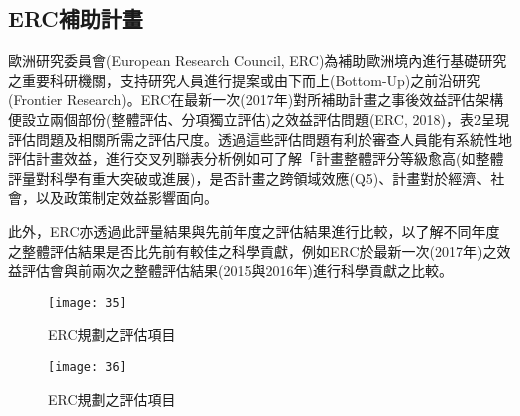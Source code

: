 \subsection{ERC補助計畫}
\par
\renewcommand{\baselinestretch}{1} %
\twelve 歐洲研究委員會(European Research Council, ERC)為補助歐洲境內進行基礎研究之重要科研機關，支持研究人員進行提案或由下而上(Bottom-Up)之前沿研究(Frontier Research)。ERC在最新一次(2017年)對所補助計畫之事後效益評估架構便設立兩個部份(整體評估、分項獨立評估)之效益評估問題(ERC, 2018)，表2呈現評估問題及相關所需之評估尺度。透過這些評估問題有利於審查人員能有系統性地評估計畫效益，進行交叉列聯表分析例如可了解「計畫整體評分等級愈高(如整體評量對科學有重大突破或進展)，是否計畫之跨領域效應(Q5)、計畫對於經濟、社會，以及政策制定效益影響面向。
\\
\par
\renewcommand{\baselinestretch}{1} %
\twelve 此外，ERC亦透過此評量結果與先前年度之評估結果進行比較，以了解不同年度之整體評估結果是否比先前有較佳之科學貢獻，例如ERC於最新一次(2017年)之效益評估會與前兩次之整體評估結果(2015與2016年)進行科學貢獻之比較。
\par
\begin{figure}[hbt!]
\begin{center}
\texttt{[image: 35]}
\caption{\large ERC規劃之評估項目}\label{fig.ERC規劃之評估項目}
\end{center}
\end{figure}
\par
\begin{figure}[hbt!]
\begin{center}
\texttt{[image: 36]}
\caption{\large ERC規劃之評估項目}\label{fig.ERC規劃之評估項目}
\end{center}
\end{figure}
\par

\renewcommand{\baselinestretch}{20} %
